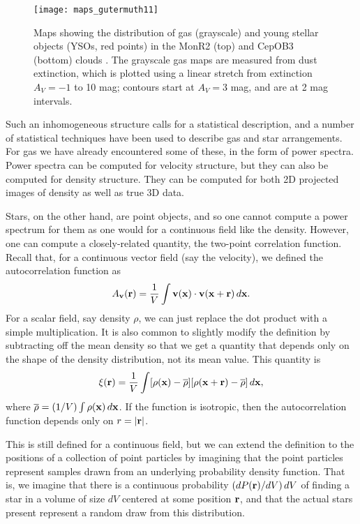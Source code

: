 \begin{figure}
\texttt{[image: maps\_gutermuth11]}
\caption[Maps of gas and young stars in two clouds]{
\label{fig:maps_gutermuth11}
Maps showing the distribution of gas (grayscale) and young stellar objects (YSOs, red points) in the MonR2 (top) and CepOB3 (bottom) clouds \citep{gutermuth11a}. The grayscale gas maps are measured from dust extinction, which is plotted using a linear stretch from extinction $A_V = -1$ to 10 mag; contours start at $A_V=3$ mag, and are at 2 mag intervals.
}
\end{figure}

Such an inhomogeneous structure calls for a statistical description, and a number of statistical techniques have been used to describe gas and star arrangements. For gas we have already encountered some of these, in the form of power spectra. Power spectra can be computed for velocity structure, but they can also be computed for density structure. They can be computed for both 2D projected images of density as well as true 3D data.

Stars, on the other hand, are point objects, and so one cannot compute a power spectrum for them as one would for a continuous field like the density. However, one can compute a closely-related quantity, the two-point correlation function. Recall that, for a continuous vector field (say the velocity), we defined the autocorrelation function as
\begin{equation}
A_{\mathbf{v}}(\mathbf{r}) = \frac{1}{V} \int \mathbf{v}(\mathbf{x}) \cdot \mathbf{v}(\mathbf{x} + \mathbf{r})\, d\mathbf{x}.
\end{equation}
For a scalar field, say density $\rho$, we can just replace the dot product with a simple multiplication. It is also common to slightly modify the definition by subtracting off the mean density so that we get a quantity that depends only on the shape of the density distribution, not its mean value. This quantity is
\begin{equation}
\label{eq:autocorr}
\xi(\vecr) = \frac{1}{V} \int [\rho(\vecx)-\overline{\rho}] [\rho(\vecx + \vecr)-\overline{\rho}]\, d\vecx,
\end{equation}
where $\overline{\rho} = (1/V) \int \rho(\mathbf{x})\, d\mathbf{x}$. If the function is isotropic, then the autocorrelation function depends only on $r=|\mathbf{r}|$.

This is still defined for a continuous field, but we can extend the definition to the positions of a collection of point particles by imagining that the point particles represent samples drawn from an underlying probability density function. That is, we imagine that there is a continuous probability $(dP(\mathbf{r})/dV)\, dV$ of finding a star in a volume of size $dV$ centered at some position $\mathbf{r}$, and that the actual stars present represent a random draw from this distribution.

